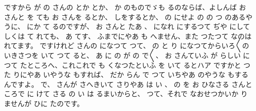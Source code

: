 ですから
が
の
さんの
とか
とか、
か
のものでゞも
るのならば、よしんば
お
さんと
を
ても
お
さんを
るとか、
しをするとか、
の
にせよ
の
の
つ
のあるやうに、
にか
て
るのですが、
お
さんと
たあ
、
になれ
にするつて
ぢや
にして
しくは
て
れても、
あ
てす、
ふまでにやあ
も
へません、また
つたつて
なのは
れてます。
ですけれど
さんの
になつて
つて、
の
と
り
になつてからいろ〳〵のいきさつを
いて
つて
ると、
あ
に
の
が
の
で〳〵、
お
さんていふ
が
らしい
に
つて
たところへ、これこれで
も
くなつたといふ
を
いて
るとハア
ですかと
つた
りにやあ
いやうな
もすれば、
だか
らん
で
つて
いちやあ
のやうな
もするんですよ。
で、
さんが
さへきいて
さりやあ
は
い
、
の
を
お
ひなさる
さんところで
に
けて
さる
の
い
は
るまいからと、
つて、それで
なおせつかいか
りませんが
ひに
たのです。

